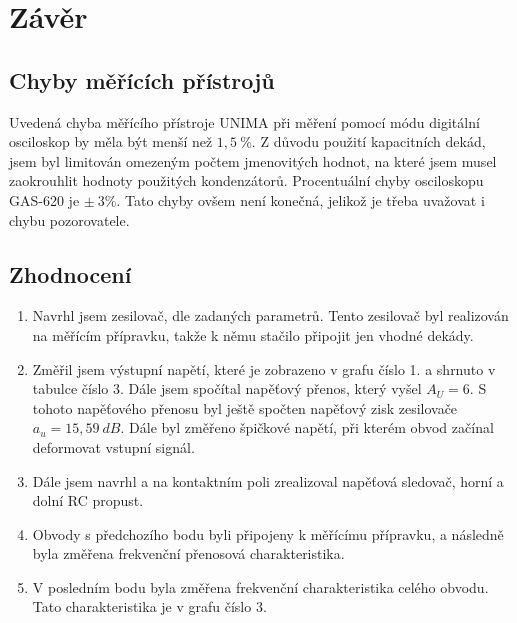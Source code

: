 \section*{Závěr}
  
  
  \subsection*{Chyby měřících přístrojů}
    \indent\indent
    Uvedená chyba měřícího přístroje UNIMA při měření pomocí módu digitální osciloskop by měla být menší než $1,5~\%$. Z důvodu použití kapacitních dekád, jsem byl limitován omezeným počtem jmenovitých hodnot, na které jsem musel zaokrouhlit hodnoty použitých kondenzátorů. Procentuální chyby osciloskopu GAS-620 je $\pm~3\%$. Tato chyby ovšem není konečná, jelikož je třeba uvažovat i chybu pozorovatele.
  
  \subsection*{Zhodnocení}
    \begin{enumerate}
      \item
        Navrhl jsem zesilovač, dle zadaných parametrů. Tento zesilovač byl realizován na měřícím přípravku, takže k němu stačilo připojit jen vhodné dekády.
      \item
        Změřil jsem výstupní napětí, které je zobrazeno v grafu číslo 1. a shrnuto v tabulce číslo 3. Dále jsem spočítal napěťový přenos, který vyšel $A_U = 6$. S tohoto napěťového přenosu byl ještě spočten napěťový zisk zesilovače $a_u = 15,59~dB$. Dále byl změřeno špičkové napětí, při kterém obvod začínal deformovat vstupní signál.
      \item
      	Dále jsem navrhl a na kontaktním poli zrealizoval napěťová sledovač, horní a dolní RC propust.
      \item
        Obvody s předchozího bodu byli připojeny k měřícímu přípravku, a následně byla změřena frekvenční přenosová charakteristika.
      \item
        V posledním bodu byla změřena frekvenční charakteristika celého obvodu. Tato charakteristika je v grafu číslo 3.
  \end{enumerate}
